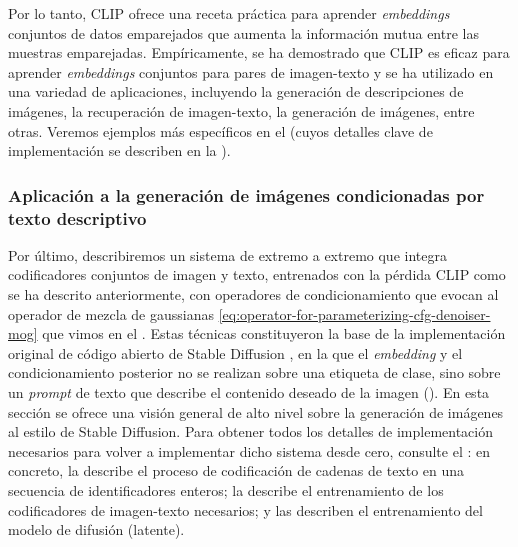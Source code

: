 \documentclass[../../book-main_es.tex]{subfiles}
\begin{document}
Por lo tanto, CLIP ofrece una receta práctica para aprender \textit{embeddings} conjuntos de datos emparejados
que aumenta la información mutua entre las muestras emparejadas.
Empíricamente, se ha demostrado que CLIP es eficaz para aprender \textit{embeddings} conjuntos
para pares de imagen-texto y se ha utilizado en una variedad de aplicaciones, incluyendo
la generación de descripciones de imágenes, la recuperación de imagen-texto, la generación de imágenes, entre otras. Veremos
ejemplos más específicos en el  (cuyos detalles clave de implementación se describen en la
).

\subsubsection{Aplicación a la generación de imágenes condicionadas por texto descriptivo}


Por último, describiremos un sistema de extremo a extremo que integra codificadores conjuntos de imagen y texto,
entrenados con la pérdida CLIP como se ha descrito anteriormente, con operadores de condicionamiento
que evocan al operador de mezcla de gaussianas
\eqref{eq:operator-for-parameterizing-cfg-denoiser-mog} que vimos en el
.
Estas técnicas
constituyeron la base de la implementación original de código abierto de Stable Diffusion
\cite{rombach2022high},
en la que el \textit{embedding} y el condicionamiento posterior no se realizan sobre
una etiqueta de clase, sino sobre un \textit{prompt} de texto que describe el contenido deseado de la imagen
().
En esta sección se ofrece una visión general de alto nivel sobre la generación de imágenes al estilo de Stable Diffusion.
Para obtener todos los detalles de implementación necesarios para volver a implementar
dicho sistema desde cero, consulte el : en concreto, la
 describe el proceso de codificación de cadenas de texto en
una secuencia de identificadores enteros; la  describe el entrenamiento de los
codificadores de imagen-texto necesarios; y las 
describen el entrenamiento del modelo de difusión (latente).
\end{document}
